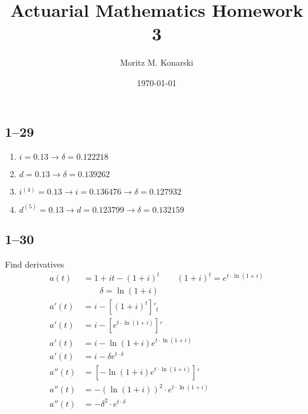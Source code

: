 \documentclass[a4paper, 12pt, reqno]{amsart}
\title{Actuarial Mathematics Homework 3}
\author{Moritz M. Konarski}
\date{\today}
\numberwithin{equation}{section}
\begin{document}
\maketitle

\subsection*{1--29}

\begin{enumerate}[label=(\alph*)]
    \item $i = 0.13 \rightarrow \delta = 0.122218$
    \item $d = 0.13 \rightarrow \delta = 0.139262$
    \item $i^{(4)} = 0.13 \rightarrow i = 0.136476 \rightarrow \delta
        = 0.127932$
    \item $d^{(5)} = 0.13 \rightarrow d = 0.123799 \rightarrow \delta
        = 0.132159$
\end{enumerate}

\subsection*{1--30}

Find derivatives
\begin{equation}\nonumber
    \begin{aligned}
        a(t) &= 1 + it - (1+i)^t \qquad (1+i)^t = e^{t \cdot \ln{(1+i)}}    \\
        &\qquad \delta = \ln{(1+i)}                                         \\
        a'(t) &= i - \left[ (1+i)^t \right]'_t                              \\
        a'(t) &= i - \left[ e^{t \cdot \ln{(1+i)}} \right]'                 \\
        a'(t) &= i -\ln{(1+i)} e^{t \cdot \ln{(1+i)}}                       \\
        a'(t) &= i -\delta e^{t \cdot \delta}                       \\
        a''(t) &=  \left[ -\ln{(1+i)} e^{t \cdot \ln{(1+i)}} \right]'       \\
        a''(t) &= -\left(\ln{(1+i)}\right)^2 \cdot e^{t \cdot \ln{(1+i)}}   \\
        a''(t) &= -\delta^2 \cdot e^{t \cdot \delta}
    \end{aligned}
\end{equation}
\end{document}
